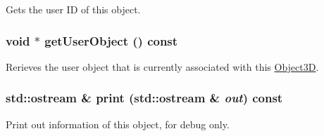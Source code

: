 Gets the user ID of this object. \hypertarget{classm3g_1_1Object3D_a9b8541216c1fa7792617218a5fb6672}{
\subsubsection[{getUserObject}]{\setlength{\rightskip}{0pt plus 5cm}void $\ast$ getUserObject () const}}
\label{classm3g_1_1Object3D_a9b8541216c1fa7792617218a5fb6672}


Rerieves the user object that is currently associated with this \hyperlink{classm3g_1_1Object3D}{Object3D}. \hypertarget{classm3g_1_1Object3D_6fea17fa1532df3794f8cb39cb4f911f}{
\subsubsection[{print}]{\setlength{\rightskip}{0pt plus 5cm}std::ostream \& print (std::ostream \& {\em out}) const}}
\label{classm3g_1_1Object3D_6fea17fa1532df3794f8cb39cb4f911f}


Print out information of this object, for debug only. 

